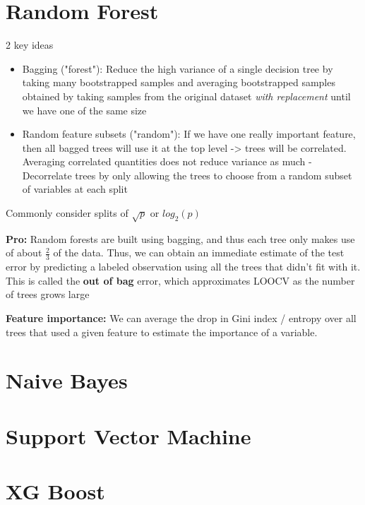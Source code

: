 \documentclass{article}
\begin{document}
\section{Random Forest}
2 key ideas
\begin{itemize}
	\item Bagging ("forest"): Reduce the high variance of a single decision tree by taking many bootstrapped samples and averaging bootstrapped samples obtained by taking samples 	from the original dataset \textit{with replacement} until we have one of the same size
	\item Random feature subsets ("random"): If we have one really important feature, then all bagged trees will use it at the top level -> trees will be correlated. Averaging correlated 		quantities does not reduce variance as much
		- Decorrelate trees by only allowing the trees to choose from a random subset of variables at each split
\end{itemize}

Commonly consider splits of $\sqrt{p}$ or $log_2(p)$

\textbf{Pro:} Random forests are built using bagging, and thus each tree only makes use of about $\frac23$ of the data. Thus, we can obtain an immediate estimate of the test error by predicting a labeled observation using all the trees that didn't fit with it. This is called the \textbf{out of bag} error, which approximates LOOCV as the number of trees grows large

\textbf{Feature importance:} We can average the drop in Gini index / entropy over all trees that used a given feature to estimate the importance of a variable. 

\section{Naive Bayes}

\section{Support Vector Machine}

\section{XG Boost}
\end{document}

